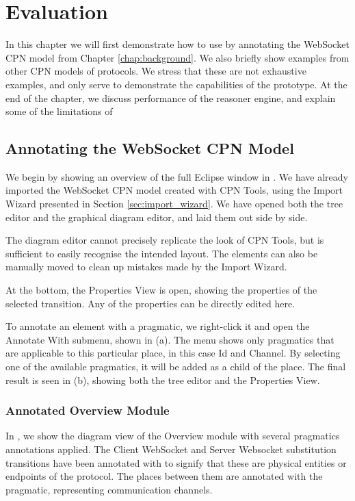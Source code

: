 \chapter{Evaluation}
\label{chap:evaluation}

In this chapter we will first demonstrate how to use \thename{} by annotating
the WebSocket CPN model from Chapter \ref{chap:background}. We also briefly
show examples from other CPN models of protocols. We stress that these are not
exhaustive examples, and only serve to demonstrate the capabilities of the
prototype. At the end of the chapter, we discuss performance of the reasoner
engine, and explain some of the limitations of \thename{}

\section{Annotating the WebSocket CPN Model}
We begin by showing an overview of the full Eclipse window in
. We have already imported the WebSocket CPN model created
with CPN Tools, using the Import Wizard presented in Section
\ref{sec:import_wizard}. We have opened both the tree editor and the
graphical diagram editor, and laid them out side by side. 


The diagram editor cannot precisely replicate the look of CPN Tools, but is
sufficient to easily recognise the intended layout. The elements can also be
manually moved to clean up mistakes made by the Import Wizard. 

At the bottom, the Properties View is open, showing the properties of the
selected transition. Any of the properties can be directly edited here.

To annotate an element with a pragmatic, we right-click it and open the Annotate
With submenu, shown in  (a). The menu shows only
pragmatics that are applicable to this particular place, in this case Id and
Channel. By selecting one of the available pragmatics, it will be added as a
child of the place. The final result is seen in  (b),
showing both the tree editor and the Properties View.


\subsection{Annotated Overview Module}
In , we show the diagram view of the Overview module
with several pragmatics annotations applied. The Client WebSocket and Server
Websocket substitution transitions have been annotated with 
to signify that these are physical entities or endpoints of the protocol. The
places between them are annotated with the  pragmatic, representing
communication channels.

